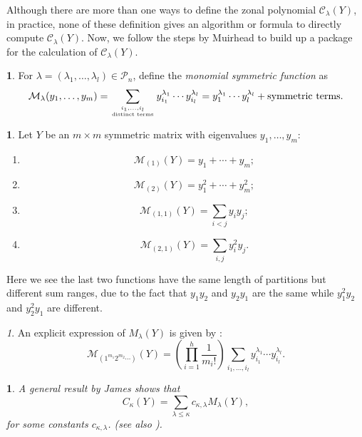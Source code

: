 \documentclass[10pt,oneside,american]{amsart}
\numberwithin{equation}{section}
\numberwithin{figure}{section}
\theoremstyle{definition}
\newtheorem{defn}{\protect\definitionname}[section]
\theoremstyle{remark}
\newtheorem{rem}{\protect\remarkname}[section]
\theoremstyle{plain}
\theoremstyle{definition}
\newtheorem{example}{\protect\examplename}[section]
\theoremstyle{plain}
\newtheorem{thm}{\protect\theoremname}[section]
\providecommand{\definitionname}{Definition}
\providecommand{\examplename}{Example}
\providecommand{\remarkname}{Remark}
\providecommand{\theoremname}{Theorem}
\begin{document}
Although there are more than one ways to define the zonal polynomial $\mathcal{C}_{\lambda}(Y)$,
in practice, none of these definition gives an algorithm or formula
to directly compute $\mathcal{C}_{\lambda}(Y)$. Now, we
follow the steps by Muirhead \cite{Muirhead} to build up a package for the
calculation of $\mathcal{C}_{\lambda}(Y)$.
\begin{defn}
For $\lambda=\left(\lambda_{1},\ldots,\lambda_{l}\right)\in\mathcal{P}_{n}$,
define the \emph{monomial symmetric function} as 
\begin{equation}
\mathcal{M}_{\lambda}(y_{1},\ldots,y_{m})=\sum_{\genfrac{}{}{0pt}{}{i_{1},\ldots,i_{l}}{\text{distinct terms}}}y_{i_{1}}^{\lambda_{1}}\cdots y_{i_{l}}^{\lambda_{l}}=y_{1}^{\lambda_{1}}\cdots y_{l}^{\lambda_{l}}+\text{symmetric terms}.\label{eq:MZonal}
\end{equation}
\end{defn}
\begin{example}
Let $Y$ be an $m\times m$ symmetric matrix with eigenvalues $y_{1},\ldots,y_{m}$:
\begin{enumerate}
\item 
\[
\mathcal{M}_{\left(1\right)}(Y)=y_{1}+\cdots+y_{m};
\]
\item 
\[
\mathcal{M}_{\left(2\right)}(Y)=y_{1}^{2}+\cdots+y_{m}^{2};
\]
\item \label{enu:ILessThanJ}
\[
\mathcal{M}_{\left(1,1\right)}(Y)=\underset{i<j}{\sum}y_{i}y_{j};
\]
\item \label{enu:IANDJ}
\[
\mathcal{M}_{\left(2,1\right)}(Y)=\underset{i,j}{\sum}y_{i}^{2}y_{j}.
\]
\end{enumerate}
Here we see the last two functions have the same length of partitions
but different sum ranges, due to the fact that $y_{1}y_{2}$ and $y_{2}y_{1}$
are the same while $y_{1}^{2}y_{2}$ and $y_{2}^{2}y_{1}$ are different. 
\end{example}
\begin{rem}
An explicit expression of $M_{\lambda}(Y)$ is given by
\cite[pp.~11, eq.~6]{Takemura}:
\begin{equation}
\mathcal{M}_{\left(1^{m_{1}}2^{m_{2}}\cdots\right)}\left(Y\right)=\left(\prod_{i=1}^{h}\frac{1}{m_{i}!}\right)\sum_{i_{1},\ldots,i_{l}}y_{i_{1}}^{\lambda_{1}}\cdots y_{i_{l}}^{\lambda_{l}}.\label{eq:MZonalComputation}
\end{equation}
\end{rem}
\begin{thm}
A general result by James \cite{James1} shows that
\begin{equation}
C_{\kappa}(Y)=\sum_{\lambda\leq\kappa}c_{\kappa,\lambda}M_{\lambda}(Y),\label{eq:CInTermsOfM}
\end{equation}
 for some constants $c_{\kappa,\lambda}$. (see also \cite[pp.~234, eq.~13]{Muirhead}).
\end{thm}
\end{document}
